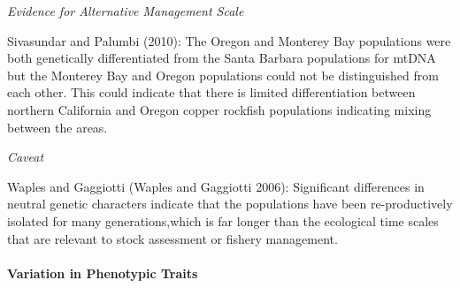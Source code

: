 \documentclass[11pt,
  english,
  a4paper,
]{article}
\begin{document}
\leavevmode\tagmcend\tagstructend\par


\emph{Evidence for Alternative Management Scale}

\leavevmode\tagmcend\tagstructend\par


Sivasundar and Palumbi {(2010)\leavevmode\tagmcend\tagstructend}: The Oregon and Monterey Bay populations were both genetically differentiated from the Santa Barbara populations for mtDNA but the Monterey Bay and Oregon populations could not be distinguished from each other. This could indicate that there is limited differentiation between northern California and Oregon copper rockfish populations indicating mixing between the areas.

\leavevmode\tagmcend\tagstructend\par


\emph{Caveat}

\leavevmode\tagmcend\tagstructend\par


Waples and Gaggiotti {(Waples and Gaggiotti 2006)\leavevmode\tagmcend\tagstructend}: Significant differences in neutral genetic characters indicate that the populations have been re-productively isolated for many generations,which is far longer than the ecological time scales that are relevant to stock assessment or fishery management.

\leavevmode\tagmcend\tagstructend\par


\hypertarget{variation-in-phenotypic-traits}{%
\paragraph{Variation in Phenotypic Traits}\label{variation-in-phenotypic-traits}}

\leavevmode\tagmcend\tagstructend

\end{document}

